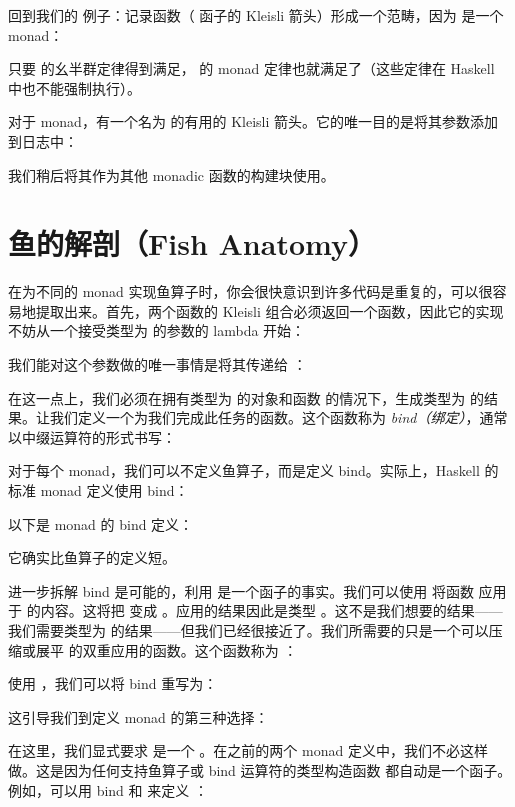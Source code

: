 回到我们的  例子：记录函数（ 函子的 Kleisli 箭头）形成一个范畴，因为  是一个 monad：

只要  的幺半群定律得到满足， 的 monad 定律也就满足了（这些定律在 Haskell 中也不能强制执行）。

对于  monad，有一个名为  的有用的 Kleisli 箭头。它的唯一目的是将其参数添加到日志中：

我们稍后将其作为其他 monadic 函数的构建块使用。

\section{鱼的解剖（Fish Anatomy）}

在为不同的 monad 实现鱼算子时，你会很快意识到许多代码是重复的，可以很容易地提取出来。首先，两个函数的 Kleisli 组合必须返回一个函数，因此它的实现不妨从一个接受类型为  的参数的 lambda 开始：

我们能对这个参数做的唯一事情是将其传递给 ：

在这一点上，我们必须在拥有类型为  的对象和函数  的情况下，生成类型为  的结果。让我们定义一个为我们完成此任务的函数。这个函数称为 \emph{bind（绑定）}，通常以中缀运算符的形式书写：

对于每个 monad，我们可以不定义鱼算子，而是定义 bind。实际上，Haskell 的标准 monad 定义使用 bind：

以下是  monad 的 bind 定义：

它确实比鱼算子的定义短。

进一步拆解 bind 是可能的，利用  是一个函子的事实。我们可以使用  将函数  应用于  的内容。这将把  变成 。应用的结果因此是类型 。这不是我们想要的结果——我们需要类型为  的结果——但我们已经很接近了。我们所需要的只是一个可以压缩或展平  的双重应用的函数。这个函数称为 ：

使用 ，我们可以将 bind 重写为：

这引导我们到定义 monad 的第三种选择：

在这里，我们显式要求  是一个 。在之前的两个 monad 定义中，我们不必这样做。这是因为任何支持鱼算子或 bind 运算符的类型构造函数  都自动是一个函子。例如，可以用 bind 和  来定义 ：


